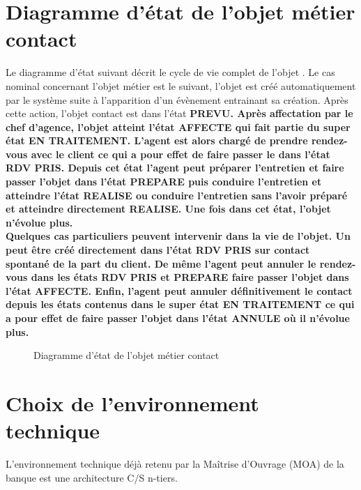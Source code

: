 \section{Diagramme d’état de l'objet métier \bf{contact}}

Le diagramme d'état suivant décrit le cycle de vie complet de l'objet . Le cas nominal concernant l'objet métier  est le suivant, l'objet est créé automatiquement par le système suite à l'apparition d'un évènement entrainant sa création. Après cette action, l'objet contact est dans l'état \bf{PREVU}. Après affectation par le chef d'agence, l'objet  atteint l'état \bf{AFFECTE} qui fait partie du super état \bf{EN TRAITEMENT}. L'agent est alors chargé de prendre rendez-vous avec le client ce qui a pour effet de faire passer le  dans l'état \bf{RDV PRIS}. Depuis cet état l'agent peut préparer l'entretien et faire passer l'objet  dans l'état \bf{PREPARE} puis conduire l'entretien et atteindre l'état \bf{REALISE} ou conduire l'entretien sans l'avoir préparé et atteindre directement \bf{REALISE}. Une fois dans cet état, l'objet  n'évolue plus. \\
Quelques cas particuliers peuvent intervenir dans la vie de l'objet. Un  peut être créé directement dans l'état \bf{RDV PRIS} sur contact spontané de la part du client. De même l'agent peut annuler le rendez-vous dans les états \bf{RDV PRIS} et \bf{PREPARE} faire passer l'objet  dans l'état \bf{AFFECTE}. Enfin, l'agent peut annuler définitivement le contact depuis les états contenus dans le super état \bf{EN TRAITEMENT} ce qui a pour effet de faire passer l'objet  dans l'état \bf{ANNULE} où il n'évolue plus.

\begin{figure}[H]
\noindent{}
\caption{Diagramme d'état de l'objet métier contact}
\end{figure}

\section{Choix  de  l’environnement  technique}
L’environnement  technique  déjà  retenu  par  la 
Maîtrise d’Ouvrage (MOA) de la banque est une architecture C/S n-tiers. 

